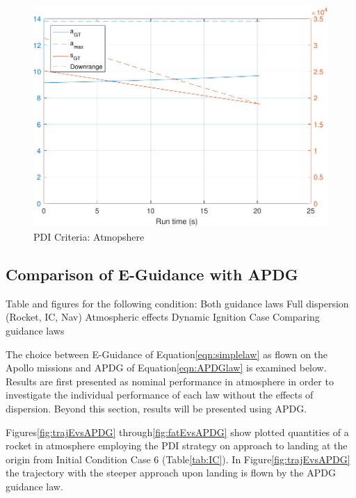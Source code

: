 \begin{figure}[H]
	\centering
	\begin{minipage}{4.5 in}
		\includegraphics[width=\linewidth]{Figures/gtcriteriaatmo.pdf}
		\caption{PDI Criteria: Atmopshere \label{fig:gtcriteriaatmo} }
	\end{minipage}
\end{figure}


\subsection{Comparison of E-Guidance with APDG} \label{sec:lawcomp}
Table and figures for the following condition:
Both guidance laws
Full dispersion (Rocket, IC, Nav)
Atmospheric effects
Dynamic Ignition Case
Comparing guidance laws

The choice between E-Guidance of Equation\:\ref{eqn:simplelaw} as flown on the Apollo missions and APDG of Equation\:\ref{eqn:APDGlaw} is examined below. Results are first presented as nominal performance in atmosphere in order to investigate the individual performance of each law without the effects of dispersion. Beyond this section, results will be presented using APDG.

Figures\:\ref{fig:trajEvsAPDG} through\:\ref{fig:fatEvsAPDG} show plotted quantities of a rocket in atmosphere employing the PDI strategy on approach to landing at the origin from Initial Condition Case 6 (Table\:\ref{tab:IC}). In Figure\:\ref{fig:trajEvsAPDG} the trajectory with the steeper approach upon landing is flown by the APDG guidance law. 


